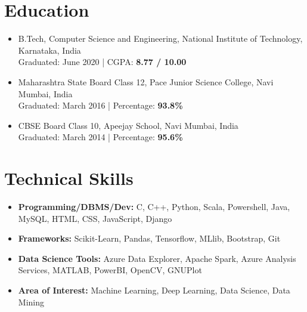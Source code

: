 \documentclass{article}
\begin{document}

\makecvtitle %


\section{Education}

\begin{itemize}
\item  B.Tech, Computer Science and Engineering, National Institute of Technology, Karnataka, India  \\
Graduated: June 2020 | CGPA: \textbf{8.77 / 10.00 }

\item Maharashtra State Board Class 12, Pace Junior Science College, Navi Mumbai, India \\
Graduated: March 2016 | Percentage: \textbf{93.8\%}

\item  CBSE Board Class 10, Apeejay School, Navi Mumbai, India \\
Graduated: March 2014 | Percentage: \textbf{95.6\%}
\end{itemize}


\section{Technical Skills}

\begin{itemize}

\item \textbf{Programming/DBMS/Dev:} C, C++, Python, Scala, Powershell, Java, MySQL, HTML, CSS, JavaScript, Django
\item \textbf{Frameworks:} Scikit-Learn, Pandas, Tensorflow, MLlib, Bootstrap, Git
\item \textbf{Data Science Tools:} Azure Data Explorer, Apache Spark, Azure Analysis Services, MATLAB, PowerBI, OpenCV, GNUPlot
\item \textbf{Area of Interest:} Machine Learning, Deep Learning, Data Science, Data Mining 

\end{itemize}
\end{document}
